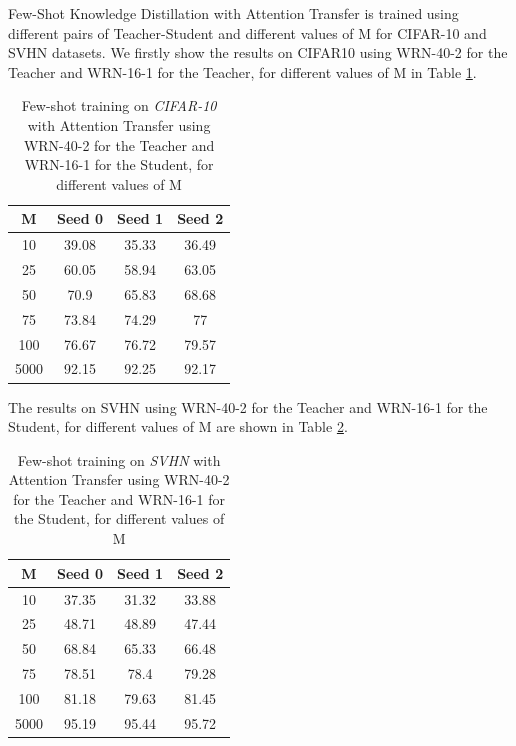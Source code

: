 Few-Shot Knowledge Distillation with Attention Transfer is trained using different pairs of Teacher-Student and different values of M for CIFAR-10 and SVHN datasets. We firstly show the results on CIFAR10 using WRN-40-2 for the Teacher and WRN-16-1 for the Teacher, for different values of M in Table \ref{tab:few_show_cifar10_mvalues}.

\begin{table}[!h]
    \centering
    \begin{tabular}{c|ccc}
    \toprule
    \toprule
         \textbf{M} & \textbf{Seed 0} & \textbf{Seed 1} & \textbf{Seed 2} \\
         \midrule
         10 & 39.08 & 35.33 & 36.49\\
         25 & 60.05 & 58.94 & 63.05\\
         50 & 70.9 & 65.83 & 68.68\\
         75 & 73.84 & 74.29 & 77\\
         100 & 76.67 & 76.72 & 79.57\\
         5000 & 92.15 & 92.25 & 92.17  \\
         \bottomrule
         \bottomrule
    \end{tabular}
    \vspace{0.25cm}
    \caption{Few-shot training on \textit{CIFAR-10} with Attention Transfer using WRN-40-2 for the Teacher and WRN-16-1 for the Student, for different values of M}
    \label{tab:few_show_cifar10_mvalues}

\end{table}

The results on SVHN using WRN-40-2 for the Teacher and WRN-16-1 for the Student, for different values of M are shown in Table \ref{tab:few_show_svhn_mvalues}.

\begin{table}[!h]
    \centering
    \begin{tabular}{c|ccc}
    \toprule
    \toprule
         \textbf{M} & \textbf{Seed 0} & \textbf{Seed 1} & \textbf{Seed 2} \\
         \midrule
         10 & 37.35 & 31.32 & 33.88\\
         25 & 48.71 & 48.89 & 47.44\\
         50 & 68.84 & 65.33 & 66.48\\
         75 & 78.51 & 78.4 &  79.28\\
         100 & 81.18 & 79.63 & 81.45 \\
         5000 & 95.19 & 95.44 & 95.72 \\
         \bottomrule
         \bottomrule
    \end{tabular}
    \vspace{0.25cm}
    \caption{Few-shot training on \textit{SVHN} with Attention Transfer using WRN-40-2 for the Teacher and WRN-16-1 for the Student, for different values of M}
    \label{tab:few_show_svhn_mvalues}
\end{table}

